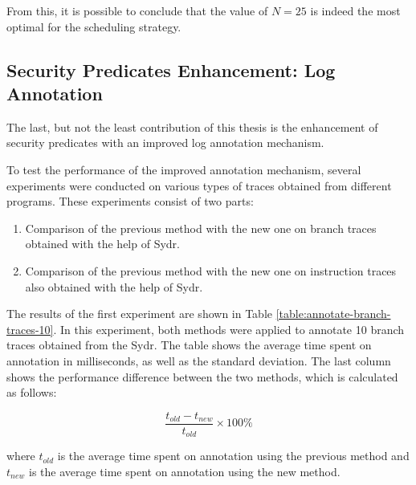 From this, it is possible to conclude that the value of $N=25$ is indeed the most optimal for the scheduling strategy.

\subsection{Security Predicates Enhancement: Log Annotation} \label{results:security-invariants-enhancement-log-annotation}

The last, but not the least contribution of this thesis is the enhancement of security predicates with an improved log annotation mechanism.

To test the performance of the improved annotation mechanism, several experiments were conducted on various types of traces obtained from different programs. These experiments consist of two parts:

\begin{enumerate}
    \item Comparison of the previous method with the new one on branch traces obtained with the help of Sydr.
    \item Comparison of the previous method with the new one on instruction traces also obtained with the help of Sydr.
\end{enumerate}

The results of the first experiment are shown in Table \ref{table:annotate-branch-traces-10}. In this experiment, both methods were applied to annotate 10 branch traces obtained from the Sydr. The table shows the average time spent on annotation in milliseconds, as well as the standard deviation. The last column shows the performance difference between the two methods, which is calculated as follows:

$$ \frac{t_{old} - t_{new}}{t_{old}} \times 100 \% $$

where $t_{old}$ is the average time spent on annotation using the previous method and $t_{new}$ is the average time spent on annotation using the new method.

